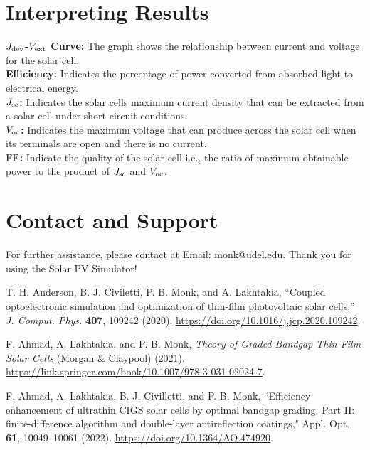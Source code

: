 \documentclass[10pt]{article}
\def\Jsc{J_{SC}}
\def\Voc{V_{oc}}
\def\Voc{V_{OC}}
\def\Jsc{J_{\rm sc}}
\def\FF{{\rm FF}}
\def\Jdev{J_{\rm dev}}
\def\Voc{V_{\rm oc}}
\def\Vext{V_{\rm ext}}
\begin{document}
\section{Interpreting Results}
\textbf{$\Jdev$-$\Vext$ Curve:} The graph shows the relationship between current and voltage for the solar cell.\\
\textbf{Efficiency:} Indicates the percentage of power converted from absorbed light to electrical energy.\\
\textbf{$\Jsc$:} Indicates the solar cells maximum current density that can be extracted from a solar cell under short circuit conditions.\\
\textbf{$\Voc$:}  Indicates the maximum voltage that can produce across the solar cell when its terminals are open and there is no current.\\
\textbf{$\FF$:} Indicate the quality of the solar cell i.e., the ratio of maximum obtainable power to the product of $\Jsc$ and $\Voc$. 

\section{Contact and Support}
For further assistance, please contact at Email: monk@udel.edu. 
Thank you for using the Solar PV Simulator!

\newpage
\begin{thebibliography}{99}

T. H. Anderson, B. J. Civiletti, P. B. Monk, and A. Lakhtakia, ``Coupled optoelectronic simulation and optimization of thin-film photovoltaic
solar cells,''  \textit{J. Comput. Phys.} \textbf{407},  109242 (2020). \href{https://doi.org/10.1016/j.jcp.2020.109242}{https://doi.org/10.1016/j.jcp.2020.109242}.


F. Ahmad, A. Lakhtakia, and P. B. Monk, \textit{Theory of Graded-Bandgap Thin-Film Solar Cells} (Morgan \& Claypool) (2021). 
\href{https://link.springer.com/book/10.1007/978-3-031-02024-7}{https://link.springer.com/book/10.1007/978-3-031-02024-7}.
	
F. Ahmad, A. Lakhtakia, B. J. Civilletti, and P. B. Monk, ``Efficiency enhancement of ultrathin CIGS solar
cells by optimal bandgap grading. Part II: finite-difference algorithm and double-layer antireflection coatings,"
{Appl. Opt.} {\bf 61},  10049--10061 (2022). \href{https://doi.org/10.1364/AO.474920}{https://doi.org/10.1364/AO.474920}.

\end{thebibliography}
\end{document}
